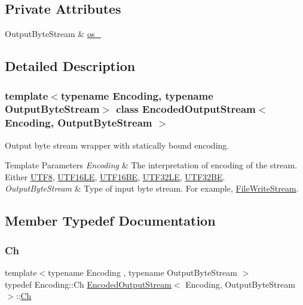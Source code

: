 \subsection*{Private Attributes}
\begin{DoxyCompactItemize}
\item 
Output\+Byte\+Stream \& \hyperlink{classEncodedOutputStream_a92839793e0a22a1da7a9008187728746}{os\+\_\+}
\end{DoxyCompactItemize}


\subsection{Detailed Description}
\subsubsection*{template$<$typename Encoding, typename Output\+Byte\+Stream$>$\newline
class Encoded\+Output\+Stream$<$ Encoding, Output\+Byte\+Stream $>$}

Output byte stream wrapper with statically bound encoding. 


\begin{DoxyTemplParams}{Template Parameters}
{\em Encoding} & The interpretation of encoding of the stream. Either \hyperlink{structUTF8}{U\+T\+F8}, \hyperlink{structUTF16LE}{U\+T\+F16\+LE}, \hyperlink{structUTF16BE}{U\+T\+F16\+BE}, \hyperlink{structUTF32LE}{U\+T\+F32\+LE}, \hyperlink{structUTF32BE}{U\+T\+F32\+BE}. \\
\hline
{\em Output\+Byte\+Stream} & Type of input byte stream. For example, \hyperlink{classFileWriteStream}{File\+Write\+Stream}. \\
\hline
\end{DoxyTemplParams}


\subsection{Member Typedef Documentation}
\mbox{\label{classEncodedOutputStream_aa8f494d7ee2808307fbc9cd658c0f760}} 
\subsubsection{\texorpdfstring{Ch}{Ch}}
{\footnotesize\ttfamily template$<$typename Encoding , typename Output\+Byte\+Stream $>$ \\
typedef Encoding\+::\+Ch \hyperlink{classEncodedOutputStream}{Encoded\+Output\+Stream}$<$ Encoding, Output\+Byte\+Stream $>$\+::\hyperlink{classEncodedOutputStream_aa8f494d7ee2808307fbc9cd658c0f760}{Ch}}



